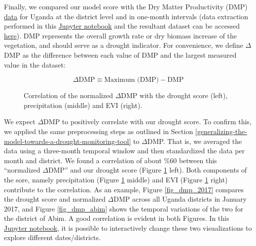 \documentclass[10pt,parskip=half,
toc=sectionentrywithdots,
bibliography=totocnumbered,
captions=tableheading,numbers=noendperiod]{scrartcl}
\begin{document}
Finally, we compared our model score with the Dry Matter Productivity
(DMP) \href{https://land.copernicus.eu/global/products/dmp}{data} for
Uganda at the district level and in one-month intervals (data extraction
performed in this
\href{https://github.com/rodekruis/IBF-system/blob/master/trigger-model-development/drought/skill-assessment/Model\%20Event\%20Data/Extracting_DMP_data.ipynb}{Jupyter
notebook} and the resultant dataset can be accessed
\href{https://github.com/rodekruis/IBF-system/blob/master/trigger-model-development/drought/skill-assessment/Model\%20Event\%20Data/datasets/Uganda_DMP_data.csv}{here}).
DMP represents the overall growth rate or dry biomass increase of the
vegetation, and should serve as a drought indicator. For convenience, we
define \(\Delta\)DMP as the difference between each value of DMP and the
largest measured value in the dataset:

\begin{equation}\label{eqn_dmp}
\Delta \textrm{DMP}\equiv \textrm{Maximum (DMP)}-\textrm{DMP}
\end{equation}

\begin{figure}[H]\begin{center}\end{center}\caption{Correlation of the normalized \(\Delta\)DMP with the drought score
(left), precipitation (middle) and EVI (right).}\label{fig_dmp_corr}\end{figure}

We expect \(\Delta\)DMP to positively correlate with our drought score.
To confirm this, we applied the same preprocessing steps as outlined in
Section \ref{generalizing-the-model-towards-a-drought-monitoring-tool}
to \(\Delta\)DMP. That is, we averaged the data using a three-month
temporal window and then standardized the data per month and district.
We found a correlation of about \%60 between this ``normalized
\(\Delta\)DMP'' and our drought score (Figure \ref{fig_dmp_corr} left).
Both components of the sore, namely precipitation (Figure
\ref{fig_dmp_corr} middle) and EVI (Figure \ref{fig_dmp_corr} right)
contribute to the correlation. As an example, Figure \ref{fig_dmp_2017}
compares the drought score and normalized \(\Delta\)DMP across all
Uganda districts in January 2017, and Figure \ref{fig_dmp_abim} shows
the temporal variations of the two for the district of Abim. A good
correlation is evident in both Figures. In this
\href{https://github.com/rodekruis/IBF-system/blob/master/trigger-model-development/drought/skill-assessment/Model\%20Event\%20Data/Uganda_logit_model.ipynb}{Jupyter
notebook}, it is possible to interactively change these two
visualizations to explore different dates/districts.
\end{document}
